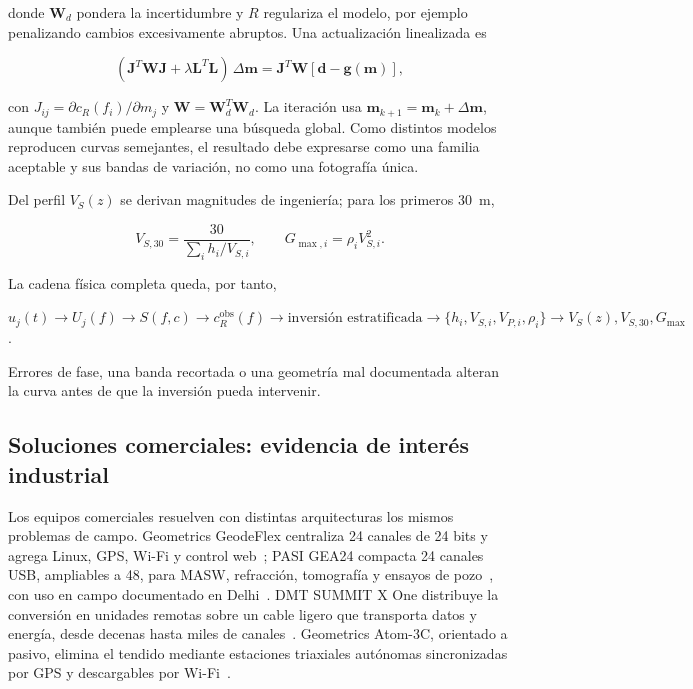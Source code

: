 donde $\boldsymbol{W}_d$ pondera la incertidumbre y $R$ regulariza el modelo, por
ejemplo penalizando cambios excesivamente abruptos. Una actualización linealizada es

\begin{equation}
    (\boldsymbol{J}^{T}\boldsymbol{W}\boldsymbol{J}+\lambda\boldsymbol{L}^{T}
    \boldsymbol{L})\,\Delta\boldsymbol{m}
    =\boldsymbol{J}^{T}\boldsymbol{W}
    [\boldsymbol{d}-\boldsymbol{g}(\boldsymbol{m})],
\end{equation}

con $J_{ij}=\partial c_R(f_i)/\partial m_j$ y
$\boldsymbol{W}=\boldsymbol{W}_d^T\boldsymbol{W}_d$. La iteración usa
$\boldsymbol{m}_{k+1}=\boldsymbol{m}_k+\Delta\boldsymbol{m}$, aunque también puede
emplearse una búsqueda global. Como distintos modelos reproducen curvas semejantes, el
resultado debe expresarse como una familia aceptable y sus bandas de variación, no como
una fotografía única.

Del perfil $V_S(z)$ se derivan magnitudes de ingeniería; para los primeros
\SI{30}{\meter},

\begin{equation}
    V_{S,30}=\frac{30}{\displaystyle\sum_i h_i/V_{S,i}},
    \qquad
    G_{\max,i}=\rho_i V_{S,i}^{2}.
\end{equation}

La cadena física completa queda, por tanto,

\begin{center}
\small
$u_j(t)\rightarrow U_j(f)\rightarrow S(f,c)\rightarrow
c_R^{\mathrm{obs}}(f)\rightarrow
\text{inversión estratificada}\rightarrow
\{h_i,V_{S,i},V_{P,i},\rho_i\}\rightarrow V_S(z),V_{S,30},G_{\max}$.
\end{center}

Errores de fase, una banda recortada o una geometría mal documentada alteran la curva
antes de que la inversión pueda intervenir.

\subsection{Soluciones comerciales: evidencia de interés industrial}

Los equipos comerciales resuelven con distintas arquitecturas los mismos problemas de
campo. Geometrics GeodeFlex centraliza 24 canales de 24 bits y agrega Linux, GPS, Wi-Fi
y control web~\cite{GeometricsGeodeFlex}; PASI GEA24 compacta 24 canales USB, ampliables
a 48, para MASW, refracción, tomografía y ensayos de pozo~\cite{PASIGEA24}, con uso en
campo documentado en Delhi~\cite{Gautam2020}. DMT SUMMIT X One distribuye la conversión
en unidades remotas sobre un cable ligero que transporta datos y energía, desde decenas
hasta miles de canales~\cite{DMTSummitXOne}. Geometrics Atom-3C, orientado a pasivo,
elimina el tendido mediante estaciones triaxiales autónomas sincronizadas por GPS y
descargables por Wi-Fi~\cite{GeometricsAtom3C}.

